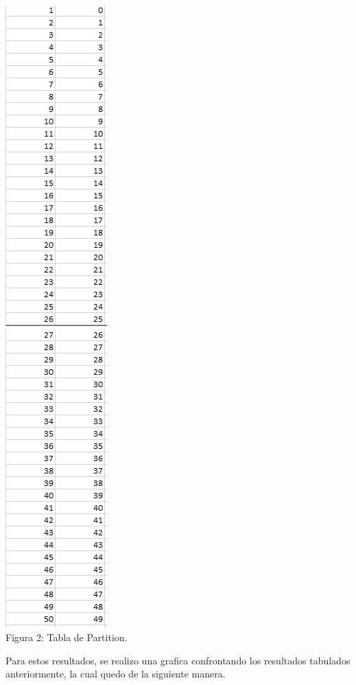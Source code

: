 \documentclass[spanish]{article}
\begin{document}
	\begin{center}
	\includegraphics[scale=.5]{./imagenes/tpar/1.png}\\
	\includegraphics[scale=.5]{./imagenes/tpar/2.png}\\
		Figura 2: Tabla de Partition.
	\end{center}
\newpage
	Para estos resultados, se realizo una grafica confrontando los resultados tabulados anteriormente, la cual quedo de la siguiente manera.\\
\end{document}
